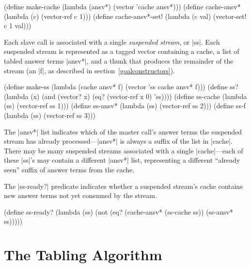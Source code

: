 \schemedisplayspace
\begin{schemedisplay} 
(define make-cache (lambda (ansv*) (vector 'cache ansv*)))
(define cache-ansv* (lambda (c) (vector-ref c 1)))
(define cache-ansv*-set! (lambda (c val) (vector-set! c 1 val)))
\end{schemedisplay}

Each slave call is associated with a single \emph{suspended stream},
or \scheme|ss|.  \noindent Each suspended stream is represented as a
tagged vector containing a cache, a list of tabled answer terms
\scheme|ansv*|, and a thunk that produces the remainder of the stream
(an \scheme|f|, as described in section~\ref{goalconstructors}).

\schemedisplayspace
\begin{schemedisplay}
(define make-ss (lambda (cache ansv* f) (vector 'ss cache ansv* f)))
(define ss? (lambda (x) (and (vector? x) (eq? (vector-ref x 0) 'ss))))
(define ss-cache (lambda (ss) (vector-ref ss 1)))
(define ss-ansv* (lambda (ss) (vector-ref ss 2)))
(define ss-f (lambda (ss) (vector-ref ss 3)))
\end{schemedisplay}

\noindent The \scheme|ansv*| list indicates which of the master call's
answer terms the suspended stream has already
processed---\scheme|ansv*| is always a suffix of the list in
\scheme|cache|.  There may be many suspended streams associated with a
single \scheme|cache|---each of these \scheme|ss|'s may contain
a different \scheme|ansv*| list, representing a different ``already
seen'' suffix of answer terms from the cache.

The \scheme|ss-ready?| predicate indicates whether a suspended
stream's cache contains new answer terms not yet consumed by the
stream.

\schemedisplayspace
\begin{schemedisplay}
(define ss-ready? (lambda (ss) (not (eq? (cache-ansv* (ss-cache ss)) (ss-ansv* ss)))))
\end{schemedisplay}



\section{The Tabling Algorithm}\label{tablingalgorithm}

